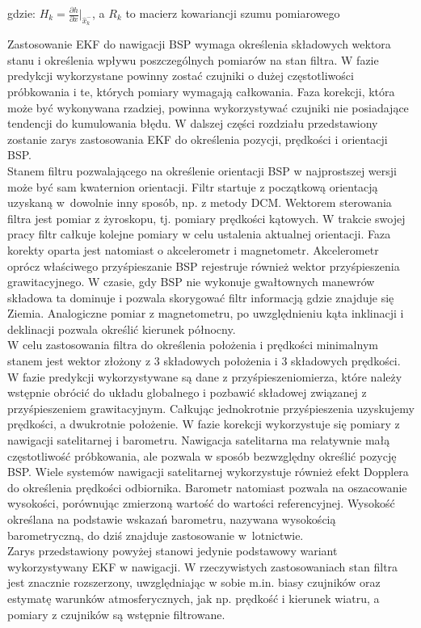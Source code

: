 gdzie: $H_k = \frac{\partial h}{\partial x}\Bigr|_{\hat{x}_k^-}$, a $R_k$ to macierz kowariancji szumu pomiarowego

Zastosowanie EKF do nawigacji BSP wymaga określenia składowych wektora stanu i określenia wpływu poszczególnych pomiarów na stan filtra. W fazie predykcji wykorzystane powinny zostać czujniki o dużej częstotliwości próbkowania i te, których pomiary wymagają całkowania. Faza korekcji, która może być wykonywana rzadziej, powinna wykorzystywać czujniki nie posiadające tendencji do kumulowania błędu. W dalszej części rozdziału przedstawiony zostanie zarys zastosowania EKF do określenia pozycji, prędkości i orientacji BSP.\\

Stanem filtru pozwalającego na określenie orientacji BSP w najprostszej wersji może być sam kwaternion orientacji. Filtr startuje z początkową orientacją uzyskaną w~dowolnie inny sposób, np. z metody DCM. Wektorem sterowania filtra jest pomiar z żyroskopu, tj. pomiary prędkości kątowych. W trakcie swojej pracy filtr całkuje kolejne pomiary w celu ustalenia aktualnej orientacji. Faza korekty oparta jest natomiast o akcelerometr i magnetometr. Akcelerometr oprócz właściwego przyśpieszanie BSP rejestruje również wektor przyśpieszenia grawitacyjnego. W czasie, gdy BSP nie wykonuje gwałtownych manewrów składowa ta dominuje i pozwala skorygować filtr informacją gdzie znajduje się Ziemia. Analogiczne pomiar z magnetometru, po uwzględnieniu kąta inklinacji i deklinacji pozwala określić kierunek północny.\\

W celu zastosowania filtra do określenia położenia i prędkości minimalnym stanem jest wektor złożony z 3 składowych położenia i 3 składowych prędkości. W fazie predykcji wykorzystywane są dane z przyśpieszeniomierza, które należy wstępnie obrócić do układu globalnego i pozbawić składowej związanej z przyśpieszeniem grawitacyjnym. Całkując jednokrotnie przyśpieszenia uzyskujemy prędkości, a dwukrotnie położenie. W fazie korekcji wykorzystuje się pomiary z nawigacji satelitarnej i barometru. Nawigacja satelitarna ma relatywnie małą częstotliwość próbkowania, ale pozwala w sposób bezwzględny określić pozycję BSP. Wiele systemów nawigacji satelitarnej wykorzystuje również efekt Dopplera do określenia prędkości odbiornika. Barometr natomiast pozwala na oszacowanie wysokości, porównując zmierzoną wartość do wartości referencyjnej. Wysokość określana na podstawie wskazań barometru, nazywana wysokością barometryczną, do dziś znajduje zastosowanie w~lotnictwie.\\

Zarys przedstawiony powyżej stanowi jedynie podstawowy wariant wykorzystywany EKF w nawigacji. W rzeczywistych zastosowaniach stan filtra jest znacznie rozszerzony, uwzględniając w sobie m.in. biasy czujników oraz estymatę warunków atmosferycznych, jak np. prędkość i kierunek wiatru, a pomiary z czujników są wstępnie filtrowane.


